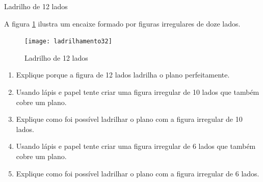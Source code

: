 \begin{task}{Ladrilho de 12 lados}

A figura \ref{12lados} ilustra um encaixe formado por figuras irregulares de doze lados. 

	\begin{figure}[H]
	\centering
	\texttt{[image: ladrilhamento32]}
\label{12lados}
\caption{Ladrilho de 12 lados}
	\end{figure}
	
	\begin{enumerate}
		\item Explique porque a figura de 12 lados ladrilha o plano perfeitamente.
		\item Usando lápis e papel tente criar uma figura irregular de 10 lados que também cobre um plano.
		\item Explique como foi possível ladrilhar o plano com a figura irregular de 10 lados.
		\item Usando lápis e papel tente criar uma figura irregular de 6 lados que também cobre um plano.
		\item Explique como foi possível ladrilhar o plano com a figura irregular de 6 lados.
	\end{enumerate}
	
\end{task}






\exercise

